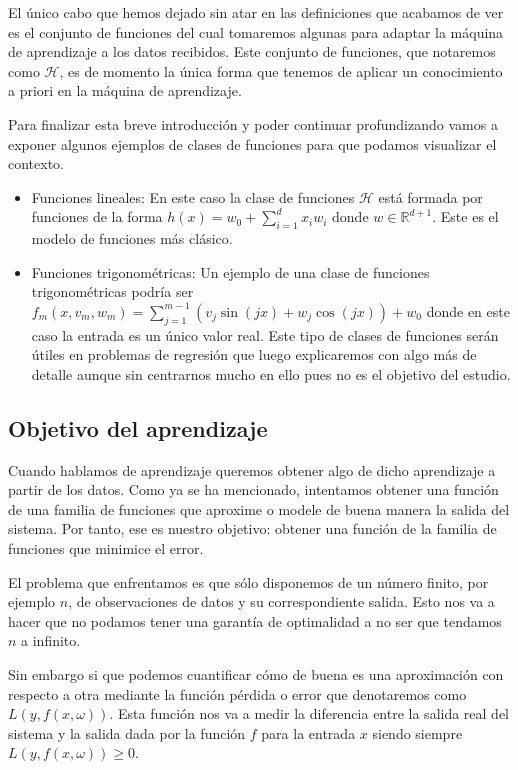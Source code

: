 El único cabo que hemos dejado sin atar en las definiciones que acabamos de ver es el conjunto de funciones del cual tomaremos algunas para adaptar la máquina de aprendizaje a los datos recibidos. Este conjunto de funciones, que notaremos como $\mathcal{H}$, es de momento la única forma que tenemos de aplicar un conocimiento a priori en la máquina de aprendizaje.

Para finalizar esta breve introducción y poder continuar profundizando vamos a exponer algunos ejemplos de clases de funciones para que podamos visualizar el contexto.

\begin{itemize}
	\item Funciones lineales: En este caso la clase de funciones $\mathcal{H}$ está formada por funciones de la forma $h(x) = w_0 + \sum_{i=1}^{d}x_i w_i$ donde $w\in \mathbb{R}^{d+1}$. Este es el modelo de funciones más clásico.
	\item Funciones trigonométricas: Un ejemplo de una clase de funciones trigonométricas podría ser $f_m(x,v_m,w_m) = \sum_{j=1}^{m-1}(v_j \sin (jx) + w_j \cos (jx)) + w_0$ donde en este caso la entrada es un único valor real. Este tipo de clases de funciones serán útiles en problemas de regresión que luego explicaremos con algo más de detalle aunque sin centrarnos mucho en ello pues no es el objetivo del estudio.
\end{itemize}

\subsection{Objetivo del aprendizaje}

Cuando hablamos de aprendizaje queremos obtener algo de dicho aprendizaje a partir de los datos. Como ya se ha mencionado, intentamos obtener una función de una familia de funciones que aproxime o modele de buena manera la salida del sistema. Por tanto, ese es nuestro objetivo: obtener una función de la familia de funciones que minimice el error.

El problema que enfrentamos es que sólo disponemos de un número finito, por ejemplo $n$, de observaciones de datos y su correspondiente salida. Esto nos va a hacer que no podamos tener una garantía de optimalidad a no ser que tendamos $n$ a infinito. 

Sin embargo si que podemos cuantificar cómo de buena es una aproximación con respecto a otra mediante la función pérdida o error que denotaremos como $L(y,f(x,\omega))$. Esta función nos va a medir la diferencia entre la salida real del sistema y la salida dada por la función $f$ para la entrada $x$ siendo siempre $L(y,f(x,\omega))\geq 0$.

